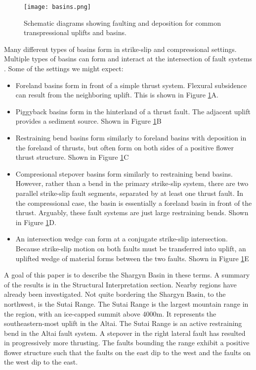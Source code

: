 \begin{figure}[h!]
  \centering
  \texttt{[image: basins.png]}
  \caption{Schematic diagrams showing faulting and deposition for common transpressional uplifts and basins.}
  \label{basintypes}
\end{figure}

Many different types of basins form in strike-slip and compressional settings. Multiple types of basins can form and interact at the intersection of fault systems \citep{Busby1995}. Some of the settings we might expect:
\begin{itemize}
	\item Foreland basins form in front of a simple thrust system. Flexural subsidence can result from the neighboring uplift. This is shown in Figure \ref{basintypes}A. 
	\item Piggyback basins form in the hinterland of a thrust fault. The adjacent uplift provides a sediment source. Shown in Figure \ref{basintypes}B
	\item Restraining bend basins form similarly to foreland basins with deposition in the foreland of thrusts, but often form on both sides of a positive flower thrust structure. Shown in Figure \ref{basintypes}C
	\item Compresional stepover basins form similarly to restraining bend basins. However, rather than a bend in the primary strike-slip system, there are two parallel strike-slip fault segments, separated by at least one thrust fault. In the compressional case, the basin is essentially a foreland basin in front of the thrust. Arguably, these fault systems are just large restraining bends. Shown in Figure \ref{basintypes}D.
	\item An intersection wedge can form at a conjugate strike-slip intersection. Because strike-slip motion on both faults must be transferred into uplift, an uplifted wedge of material forms between the two faults. Shown in Figure \ref{basintypes}E
\end{itemize}

	A goal of this paper is to describe the Shargyn Basin in these terms. A summary of the results is in the Structural Interpretation section. Nearby regions have already been investigated. Not quite bordering the Shargyn Basin, to the northwest, is the Sutai Range. The Sutai Range is the largest mountain range in the region, with an ice-capped summit above 4000m. It represents the southeastern-most uplift in the Altai. The Sutai Range is an active restraining bend in the Altai fault system\citep{Cunningham2003}\citep{Howard2006}. A stepover in the right lateral fault has resulted in progressively more thrusting. The faults bounding the range exhibit a positive flower structure such that the faults on the east dip to the west and the faults on the west dip to the east\citep{Cunningham2003}. 
	

